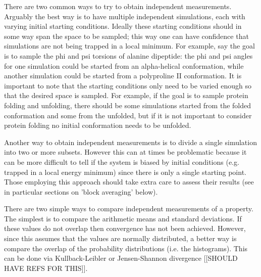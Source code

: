  There are two common ways to try to obtain independent measurements. Arguably the best way is to have multiple independent simulations, each with varying initial starting conditions. Ideally these starting conditions should in some way span the space to be sampled; this way one can have confidence that simulations are not being trapped in a local minimum. For example, say the goal is to sample the phi and psi torsions of alanine dipeptide: the phi and psi angles for one simulation could be started from an alpha-helical conformation, while another simulation could be started from a polyproline II conformation. It is important to note that the starting conditions only need to be varied enough so that the desired space is sampled. For example, if the goal is to sample protein folding and unfolding, there should be some simulations started from the folded conformation and some from the unfolded, but if it is not important to consider protein folding no initial conformation needs to be unfolded.

Another way to obtain independent measurements is to divide a single simulation into two or more subsets. However this can at times be problematic because it can be more difficult to tell if the system is biased by initial conditions (e.g. trapped in a local energy minimum) since there is only a single starting point. Those employing this approach should take extra care to assess their results (see in particular sections on 'block averaging' below).

There are two simple ways to compare independent measurements of a property. The simplest is to compare the arithmetic means and standard deviations. If these values do not overlap then convergence has not been achieved. However, since this assumes that the values are normally distributed, a better way is compare the overlap of the probability distributions (i.e. the histograms). This can be done via Kullback-Leibler or Jensen-Shannon divergence {\color{red}[[SHOULD HAVE REFS FOR THIS]]}.


